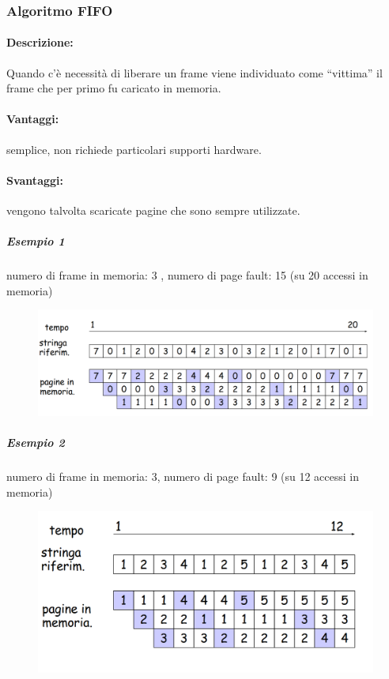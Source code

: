 \subsubsection{Algoritmo FIFO}
\paragraph{Descrizione:}Quando c’è necessità di liberare un frame viene individuato come “vittima” il frame che per primo fu caricato in memoria.

\paragraph{Vantaggi: }semplice, non richiede particolari supporti hardware.
\paragraph{Svantaggi:} vengono talvolta scaricate pagine che sono sempre utilizzate.

\subparagraph{Esempio 1}
numero di frame in memoria: 3 , numero di page fault: 15 (su 20 accessi in memoria)

\begin{figure} [h]
    \centering
    \includegraphics[width=0.8\linewidth]{Images/Screenshot 2025-01-17 at 17-41-02 so-05-memoria - so-05-memoria.pdf.png}
\end{figure}

\newpage

\subparagraph{Esempio 2}
numero di frame in memoria: 3, numero di page fault: 9 (su 12 accessi in memoria)

\begin{figure} [h]
    \centering
    \includegraphics[width=0.65\linewidth]{Images/Screenshot 2025-01-17 at 17-42-55 so-05-memoria - so-05-memoria.pdf.png}
\end{figure}



